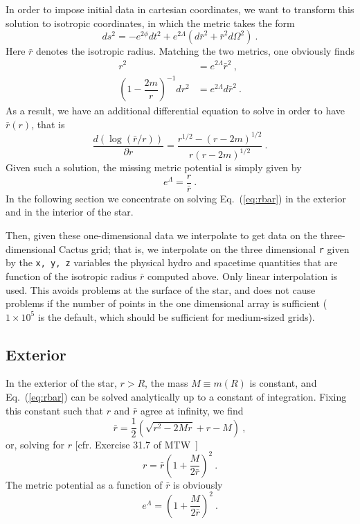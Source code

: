 In order to impose initial data in cartesian coordinates, we want to transform
this solution to isotropic coordinates, in which the metric takes the form
\begin{equation}
\label{eq:metr_iso}
ds^2 = -e^{2\phi}dt^2+e^{2\Lambda}\left(d\bar{r}^2+\bar{r}^2d\Omega^2\right) \ .
\end{equation}
Here $\bar{r}$ denotes the isotropic radius. Matching the two metrics, one
obviously finds
\begin{align}
r^2                                    &= e^{2\Lambda}\bar{r}^2 \ , \\
\left(1-\dfrac{2m}{r}\right)^{-1} dr^2 &= e^{2\Lambda}d\bar{r}^2 \ .
\end{align}
As a result, we have an additional differential equation to solve in order
to have $\bar{r}(r)$, that is
\begin{equation}
\label{eq:rbar}
\frac{d (\log(\bar{r} / r))}{\partial r} =  \frac{r^{1/2} - (r-2m)^{1/2}}{r(r-2m)^{1/2}} \ .
\end{equation}
Given such a solution, the missing metric potential is simply given by
\begin{equation}
e^{\Lambda} = \dfrac{r}{\bar{r}} \ .
\end{equation}
In the following section we concentrate on solving Eq.~(\ref{eq:rbar}) in the
exterior and in the interior of the star.

Then, given these one-dimensional data we interpolate to get data on 
the three-dimensional Cactus grid; that is, we interpolate on the three dimensional 
{\tt r} given by the {\tt x, y, z} variables the physical hydro and spacetime
quantities that are function of the isotropic radius $\bar{r}$ computed above. 
Only linear interpolation is used. This avoids problems at the surface of the 
star, and does not cause problems if the number of points in the one dimensional 
array is sufficient ($1\times 10^5$ is the default, which should be sufficient for 
medium-sized grids).

\subsection{Exterior}
\label{sbsc:exterior}

In the exterior of the star, $r>R$, the mass $M\equiv m(R)$ is constant, and 
Eq.~(\ref{eq:rbar}) can be solved analytically up to a constant of integration. 
Fixing this constant such that $r$ and $\bar{r}$ agree at infinity, we find
\begin{equation}
\bar{r} = \dfrac{1}{2}\left(\sqrt{r^2-2Mr}+r -M\right) \ ,
\end{equation}
or, solving for $r$ [cfr. Exercise 31.7 of MTW~\cite{mtw}]
\begin{equation}
r=\bar{r}\left(1+\dfrac{M}{2\bar{r}}\right)^2 \ .
\end{equation}
The metric potential as a function of $\bar{r}$ is obviously
\begin{equation}
e^{\Lambda} = \left(1+\dfrac{M}{2\bar{r}}\right)^2 \ .
\end{equation}


